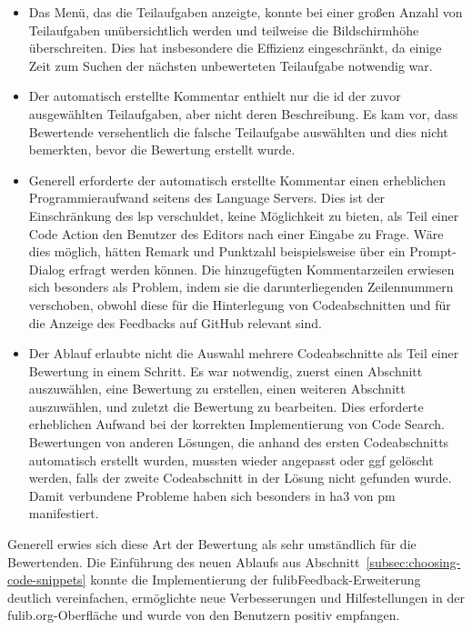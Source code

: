 \begin{itemize}
    \item Das Menü, das die Teilaufgaben anzeigte, konnte bei einer großen Anzahl von Teilaufgaben unübersichtlich werden und teilweise die Bildschirmhöhe überschreiten.
    Dies hat insbesondere die Effizienz eingeschränkt, da einige Zeit zum Suchen der nächsten unbewerteten Teilaufgabe notwendig war.
    \item Der automatisch erstellte Kommentar enthielt nur die \ac{id} der zuvor ausgewählten Teilaufgaben, aber nicht deren Beschreibung.
    Es kam vor, dass Bewertende versehentlich die falsche Teilaufgabe auswählten und dies nicht bemerkten, bevor die Bewertung erstellt wurde.
    \item Generell erforderte der automatisch erstellte Kommentar einen erheblichen Programmieraufwand seitens des Language Servers.
    Dies ist der Einschränkung des \ac{lsp} verschuldet, keine Möglichkeit zu bieten, als Teil einer Code Action den Benutzer des Editors nach einer Eingabe zu Frage.
    Wäre dies möglich, hätten Remark und Punktzahl beispielsweise über ein Prompt-Dialog erfragt werden können.
    Die hinzugefügten Kommentarzeilen erwiesen sich besonders als Problem, indem sie die darunterliegenden Zeilennummern verschoben, obwohl diese für die Hinterlegung von Codeabschnitten und für die Anzeige des Feedbacks auf GitHub relevant sind.
    \item Der Ablauf erlaubte nicht die Auswahl mehrere Codeabschnitte als Teil einer Bewertung in einem Schritt.
    Es war notwendig, zuerst einen Abschnitt auszuwählen, eine Bewertung zu erstellen, einen weiteren Abschnitt auszuwählen, und zuletzt die Bewertung zu bearbeiten.
    Dies erforderte erheblichen Aufwand bei der korrekten Implementierung von Code Search.
    Bewertungen von anderen Lösungen, die anhand des ersten Codeabschnitts automatisch erstellt wurden, mussten wieder angepasst oder \ac{ggf} gelöscht werden, falls der zweite Codeabschnitt in der Lösung nicht gefunden wurde.
    Damit verbundene Probleme haben sich besonders in \ac{ha}3 von \ac{pm} manifestiert.
\end{itemize}

Generell erwies sich diese Art der Bewertung als sehr umständlich für die Bewertenden.
Die Einführung des neuen Ablaufs aus Abschnitt~\ref{subsec:choosing-code-snippets} konnte die Implementierung der fulibFeedback-Erweiterung deutlich vereinfachen, ermöglichte neue Verbesserungen und Hilfestellungen in der fulib.org-Oberfläche und wurde von den Benutzern positiv empfangen.

